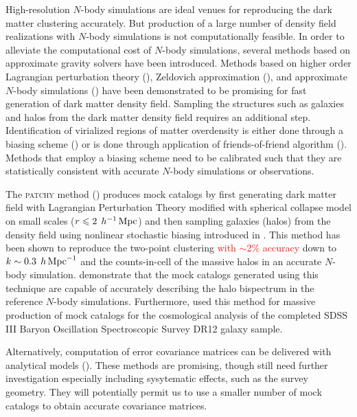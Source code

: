 \documentclass[english,usenatbib]{mn2e}
\newcommand{\tod}[1]{{\textcolor{red}{ #1}}}
\newcommand{\mperh}{\,h^{-1}\,{\rm Mpc}}
\newcommand{\hperm}{\,h\,{\rm Mpc}^{-1}}
\begin{document}
High-resolution $N$-body simulations are ideal venues for reproducing the dark matter clustering accurately. But production of a large number of density field realizations with $N$-body simulations is not computationally feasible. In order to alleviate the computational cost of $N$-body simulations, several methods based on approximate gravity solvers have been introduced. Methods based on higher order Lagrangian perturbation theory (\citealt{buchert1993,bouchet1995,catelan1995,monaco2002,scocci2002,alpt}), Zeldovich approximation (\citealt{eazymock}), and approximate $N$-body simulations (\citealt{cola2013,qpm,howlet2015,cola,fastpm,ice_cola,koda}) have been demonstrated to be promising for fast generation of dark matter density field. Sampling the structures such as galaxies and halos from the dark matter density field requires an additional step. Identification of virialized regions of matter overdensity is either done through a biasing scheme (\citealt{kitaura2014,qpm}) or is done through application of friends-of-friend algorithm (\citealt{pthalo,koda,fastpm}). Methods that employ a biasing scheme need to be calibrated such that they are statistically consistent with accurate $N$-body simulations or observations. 

The \textsc{patchy} method (\citealt{kitaura2014,kitaura2015}) produces mock catalogs by first generating dark matter field with Lagrangian Perturbation Theory modified with spherical collapse model on small scales ($r \leq 2 \; \mperh$) and then sampling galaxies (halos) from the density field using nonlinear stochastic biasing introduced in \citet{kitaura2014}. This method has been shown to reproduce the two-point clustering \tod{with $\sim$2\% accuracy} down to $k \sim 0.3 \; \hperm$ and the counts-in-cell of the massive halos in an accurate $N$-body simulation. \citet{kitaura2015} demonstrate that the mock catalogs generated using this technique are capable of accurately describing the halo bispectrum in the reference $N$-body simulations. Furthermore, \citet{kitaura2016} used this method for massive production of mock catalogs for the cosmological analysis of the completed SDSS III Baryon Oscillation Spectroscopic Survey DR12 galaxy sample. 

Alternatively, computation of error covariance matrices can be delivered with analytical models (\citealt{feldman1994,smith2008,crocce2011,sun2013,grieb2016,klaus2016}). 
These methods are promising, though still need further investigation especially including sysytematic effects, such as the survey geometry. They will potentially permit us to use a smaller number of mock catalogs to obtain accurate covariance matrices.
\end{document}
